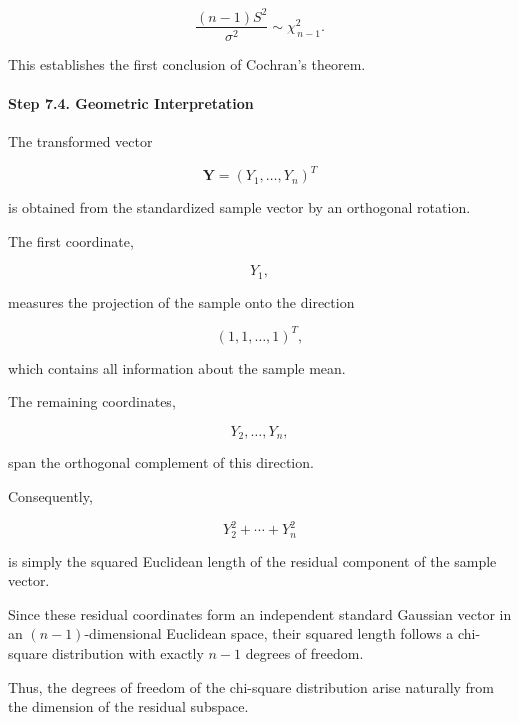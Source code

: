 \documentclass[11pt]{article}
\begin{document}
\begin{mdframed}[
		linewidth=0.8pt,
		roundcorner=6pt,
		backgroundcolor=gray!5,
		linecolor=gray!60,
		innertopmargin=10pt,
		innerbottommargin=10pt,
		innerleftmargin=10pt,
		innerrightmargin=10pt
		]
		\[
		\boxed{
			\frac{(n-1)S^2}{\sigma^2}
			\sim
			\chi_{\,n-1}^2.
		}
		\]
		
		This establishes the first conclusion of Cochran's theorem.
		
		\vspace{0.3cm}
		
		\paragraph{Step 7.4. Geometric Interpretation}
		
		The transformed vector
		
		\[
		\mathbf Y
		=
		(Y_1,\ldots,Y_n)^T
		\]
		
		is obtained from the standardized sample vector by an orthogonal rotation.
		
		The first coordinate,
		
		\[
		Y_1,
		\]
		
		measures the projection of the sample onto the direction
		
		\[
		(1,1,\ldots,1)^T,
		\]
		
		which contains all information about the sample mean.
		
		The remaining coordinates,
		
		\[
		Y_2,\ldots,Y_n,
		\]
		
		span the orthogonal complement of this direction.
		
		Consequently,
		
		\[
		Y_2^2+\cdots+Y_n^2
		\]
		
		is simply the squared Euclidean length of the residual component of the
		sample vector.
		
		Since these residual coordinates form an independent standard Gaussian
		vector in an $(n-1)$-dimensional Euclidean space, their squared length
		follows a chi-square distribution with exactly $n-1$ degrees of freedom.
		
		Thus, the degrees of freedom of the chi-square distribution arise
		naturally from the dimension of the residual subspace.
		
	\end{mdframed}
	
\end{document}
